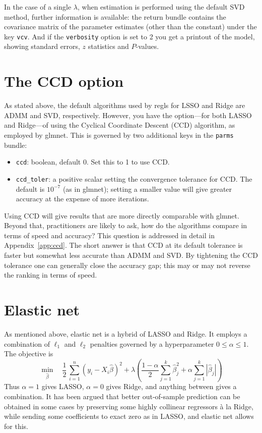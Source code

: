 \documentclass{article}
\begin{document}
In the case of a single $\lambda$, when estimation is performed using
the default SVD method, further information is available: the return
bundle contains the covariance matrix of the parameter estimates
(other than the constant) under the key \texttt{vcv}. And if the
\texttt{verbosity} option is set to 2 you get a printout of the model,
showing standard errors, $z$ statistics and $P$-values.

\section{The CCD option}
\label{sec:ccd}

As stated above, the default algorithms used by \textsf{regls} for
LSSO and Ridge are ADMM and SVD, respectively. However, you have the
option---for both LASSO and Ridge---of using the Cyclical Coordinate
Descent (CCD) algorithm, as employed by \textsf{glmnet}. This is
governed by two additional keys in the \texttt{parms} bundle:
\begin{itemize}
\item \texttt{ccd}: boolean, default 0. Set this to 1 to use CCD.
\item \texttt{ccd\_toler}: a positive scalar setting the convergence
  tolerance for CCD. The default is $10^{-7}$ (as in \textsf{glmnet});
  setting a smaller value will give greater accuracy at the expense of
  more iterations.
\end{itemize}

Using CCD will give results that are more directly comparable with
\textsf{glmnet}. Beyond that, practitioners are likely to ask, how do
the algorithms compare in terms of speed and accuracy? This question
is addressed in detail in Appendix~\ref{app:ccd}. The short answer
is that CCD at its default tolerance is faster but somewhat less
accurate than ADMM and SVD. By tightening the CCD tolerance one can
generally close the accuracy gap; this may or may not reverse the
ranking in terms of speed.

\section{Elastic net}
\label{sec:elnet}

As mentioned above, elastic net is a hybrid of LASSO and Ridge. It
employs a combination of $\ell_1$ and $\ell_2$ penalties governed by a
hyperparameter $0 \leq \alpha \leq 1$. The objective is
\[
    \min_{\hat{\beta}} \quad \frac{1}{2}\,
    \sum_{i=1}^n (y_i - X_i\hat{\beta})^2 +
    \lambda \left(\frac{1-\alpha}{2} \sum_{j=1}^k \hat{\beta}_j^2
      + \alpha \sum_{j=1}^k |\hat{\beta}_j|\right)
  \]
Thus $\alpha = 1$ gives LASSO, $\alpha = 0$ gives Ridge, and anything
between gives a combination. It has been argued that better
out-of-sample prediction can be obtained in some cases by preserving
some highly collinear regressors \`a la Ridge, while sending some
coefficients to exact zero as in LASSO, and elastic net allows for
this.
\end{document}
